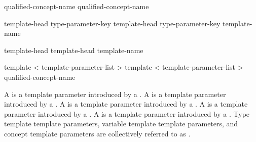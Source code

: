 \documentclass{wg21}
\begin{document}
\begin{bnf}
    \br
    \br
\end{bnf}

\begin{bnf}
    \br
    qualified-concept-name \br
    qualified-concept-name \terminal{<}  \terminal{>}
\end{bnf}

\begin{addedblock}

\begin{bnf}
\br
template-head type-parameter-key  \br
template-head type-parameter-key  \terminal{=}  template-name
\end{bnf}

\begin{bnf}
    \br
    template-head   \br
    template-head   \terminal{=}  template-name
\end{bnf}

\begin{bnf}
    \br
    template < template-parameter-list >   \br
    template < template-parameter-list >   \terminal{=} qualified-concept-name
\end{bnf}

A  is a template parameter introduced by a .
A  is a template parameter introduced by a .
A  is a template parameter introduced by a .
A  is a template parameter introduced by a .
A  is a template parameter introduced by a .
Type template template parameters, variable template template parameters, and concept template parameters are collectively referred to as .

\end{addedblock}
\end{document}
